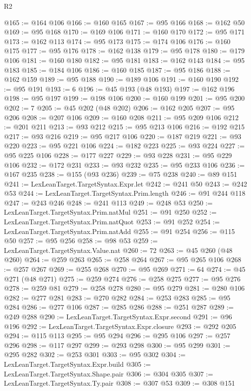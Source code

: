 \begin{lexlean}{R2}
\begin{coremodule}
@165 := @164 @106
@166 := @160 @165
@167 := @95 @166
@168 := @162 @50
@169 := @95 @168
@170 := @169 @106
@171 := @160 @170
@172 := @95 @171
@173 := @162 @113
@174 := @95 @173
@175 := @174 @106
@176 := @160 @175
@177 := @95 @176
@178 := @162 @138
@179 := @95 @178
@180 := @179 @106
@181 := @160 @180
@182 := @95 @181
@183 := @162 @143
@184 := @95 @183
@185 := @184 @106
@186 := @160 @185
@187 := @95 @186
@188 := @162 @159
@189 := @95 @188
@190 := @189 @106
@191 := @160 @190
@192 := @95 @191
@193 := 6
@196 := @45 @193 (@48 @193)
@197 := @162 @196
@198 := @95 @197
@199 := @198 @106
@200 := @160 @199
@201 := @95 @200
@202 := 7
@205 := @45 @202 (@48 @202)
@206 := @162 @205
@207 := @95 @206
@208 := @207 @106
@209 := @160 @208
@211 := @95 @209 @106
@212 := @201 @211
@213 := @93 @212
@215 := @95 @213 @106
@216 := @192 @215
@217 := @93 @216
@219 := @95 @217 @106
@220 := @187 @219
@221 := @93 @220
@223 := @95 @221 @106
@224 := @182 @223
@225 := @93 @224
@227 := @95 @225 @106
@228 := @177 @227
@229 := @93 @228
@231 := @95 @229 @106
@232 := @172 @231
@233 := @93 @232
@235 := @95 @233 @106
@236 := @167 @235
@238 := @155 (@93 @236)
@239 := @75 @238
@240 := @89 @151
@241 := LexLeanTarget.TargetSyntax.Expr.let
@242 := @241 @50
@243 := @242 @53
@244 := LexLeanTarget.TargetSyntax.Prim.length
@246 := @91 @244 @118
@247 := @243 @246
@248 := @241 @113
@249 := @248 @53
@250 := LexLeanTarget.TargetSyntax.Prim.natMul
@251 := @91 @250
@252 := LexLeanTarget.TargetSyntax.Prim.natQuot
@253 := @91 @252
@254 := LexLeanTarget.TargetSyntax.Prim.natAdd
@255 := @91 @254
@256 := @115 @50
@257 := @95 @256
@258 := @98 @53
@259 := LexLeanTarget.TargetSyntax.Value.nat
@260 := 72
@263 := @45 @260 (@48 @260)
@264 := @259 @263
@265 := @258 @264
@267 := @95 @265 @106
@268 := @257 @267
@269 := @255 @268
@270 := @95 @269
@271 := 64
@274 := @45 @271 (@48 @271)
@275 := @259 @274
@276 := @258 @275
@277 := @95 @276
@278 := @259 @81
@279 := @258 @278
@280 := @95 @279
@281 := @280 @106
@282 := @277 @281
@283 := @270 @282
@284 := @253 @283
@285 := @95 @284
@286 := @277 @106
@287 := @285 @286
@288 := @251 @287
@289 := @249 @288
@290 := LexLeanTarget.TargetSyntax.Expr.second
@291 := @96 @196
@292 := LexLeanTarget.TargetSyntax.Expr.closure
@293 := @292 @205
@294 := @115 @113
@295 := @95 @294
@296 := @295 @106
@297 := @257 @296
@298 := @117 @297
@299 := @293 @298
@300 := @95 @299
@301 := @295 @282
@302 := @253 @301
@303 := @95 @302
@304 := LexLeanTarget.TargetSyntax.Expr.build
@305 := LexLeanTarget.TargetSyntax.Shape.pair
@306 := @304 @305
@307 := LexLeanTarget.TargetSyntax.Ty.pair
@308 := @307 @53
@309 := @308 @151

\end{coremodule}
\end{lexlean}
